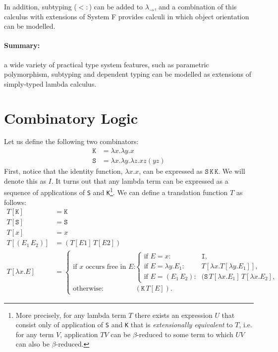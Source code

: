 \documentclass[11pt,twoside,a4paper]{article} %
\newcommand{\sym}[1]{\texttt{#1}}
\newcommand{\msym}[1]{\mathtt{#1}}
\begin{document}
In addition, subtyping ($<:$) can be added to $\lambda_\rightarrow$, and a
combination of this calculus with extensions of System F provides calculi in
which object orientation can be modelled.

\paragraph{Summary:} a wide variety of practical type system features, such as
parametric polymorphism, subtyping and dependent typing can be modelled as 
extensions of simply-typed lambda calculus.


\section{Combinatory Logic}

Let us define the following two combinators:
\begin{align*}
\msym{K} &= \lambda x.\lambda y.x \\
\msym{S} &= \lambda x.\lambda y.\lambda z.x z (y z)
\end{align*}
First, notice that the identity function, $\lambda x.x$, can be expressed as 
$\msym{S}\,\msym{K}\,\msym{K}$. We will denote this as $I$. It turns out that any 
lambda term can be expressed as a sequence of applications 
of \sym{S} and \sym{K}\footnote{More precisely, for any lambda term $T$ there exists an
expression $U$ that consist only of application of \sym{S} and \sym{K} that is 
\textit{extensionally equivalent} to $T$, i.e. for any term $V$, application $TV$ can be
$\beta$-reduced to some term to which $UV$ can also be $\beta$-reduced.}. 
We can define a translation function $T$ as follows:
\begin{align*}
T[\msym{K}]    &= \msym{K} \\
T[\msym{S}]    &= \msym{S} \\
T[x]           &= x \\
T[(E_1\,E_2)]  &= (T[E1]\,T[E2]) \\
T[\lambda x.E] &= \begin{cases}
    \text{if $x$ occurs free in $E$:} & \begin{cases}
        \text{if $E=x$:}             & \msym{I},\\
        \text{if $E=\lambda y.E_1$:} & T[\lambda x.T[\lambda y.E_1]], \\
        \text{if $E=(E_1\,E_2)$:}    & (\msym{S}\,T[\lambda x.E_1]\,T[\lambda x.E_2
        ],
    \end{cases} \\
    \text{otherwise:} & (\msym{K}\,T[E]).
  \end{cases}
\end{align*}
\end{document}
